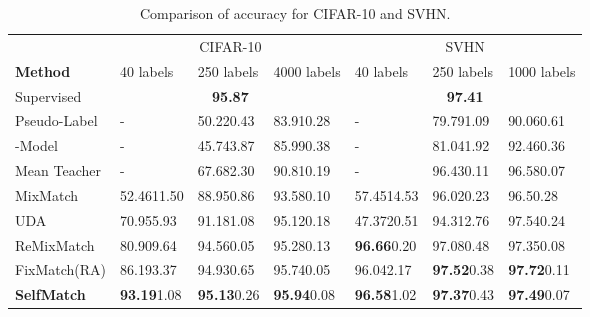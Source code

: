 \documentclass{article}
\begin{document}
\begin{table}[t]
  \caption{Comparison of accuracy for CIFAR-10 and SVHN.}
  \label{table:comparison-of-accuracy}
  
  \centering
  \begin{tabular}{m{2.1cm} m{1.5cm}m{1.5cm}m{1.6cm} m{1.5cm}m{1.5cm}m{1.6cm}}
    \toprule
     & \multicolumn{3}{c}{CIFAR-10} & \multicolumn{3}{c}{SVHN} \\
    
    \cmidrule(lr){2-4} \cmidrule(lr){5-7}
    \noalign{\smallskip}
    \textbf{Method}             & 40 labels & 250 labels & 4000 labels & 40 labels & 250 labels & 1000 labels \\
  
    \cmidrule(lr){1-1} \cmidrule(lr){2-4} \cmidrule(lr){5-7}
    \noalign{\smallskip}
    Supervised                  & \multicolumn{3}{c}{\textbf{95.87}} & \multicolumn{3}{c}{\textbf{97.41}} \\
    
    \cmidrule(lr){1-1} \cmidrule(lr){2-4} \cmidrule(lr){5-7}
    \noalign{\smallskip}
    Pseudo-Label                & - & 50.220.43 & 83.910.28 & - & 79.791.09 & 90.060.61 \\
    
    \cmidrule(lr){1-1} \cmidrule(lr){2-4} \cmidrule(lr){5-7}
    \noalign{\smallskip}
    -Model                 & - & 45.743.87 & 85.990.38 & - & 81.041.92 & 92.460.36 \\
    Mean Teacher                & - & 67.682.30 & 90.810.19 & - & 96.430.11 & 96.580.07 \\
    
    \cmidrule(lr){1-1} \cmidrule(lr){2-4} \cmidrule(lr){5-7}
    \noalign{\smallskip}
    MixMatch		            & 52.4611.50 & 88.950.86 & 93.580.10 & 57.4514.53 & 96.020.23 & 96.50.28 \\
    UDA                         & 70.955.93 & 91.181.08 & 95.120.18 & 47.3720.51 & 94.312.76 & 97.540.24 \\
    ReMixMatch                  & 80.909.64 & 94.560.05 & 95.280.13 & \textbf{96.66}0.20 & 97.080.48 & 97.350.08 \\
    FixMatch(RA)     	        & 86.193.37 & 94.930.65 & 95.740.05 & 96.042.17 & \textbf{97.52}0.38 & \textbf{97.72}0.11 \\ 
    
    \cmidrule(lr){1-1} \cmidrule(lr){2-4} \cmidrule(lr){5-7}
    \noalign{\smallskip}
    \textbf{SelfMatch} & \textbf{93.19}1.08 & \textbf{95.13}0.26 & \textbf{95.94}0.08 & \textbf{96.58}1.02 & \textbf{97.37}0.43 & \textbf{97.49}0.07 \\
    
    \bottomrule
  \end{tabular}
\end{table}
\end{document}
